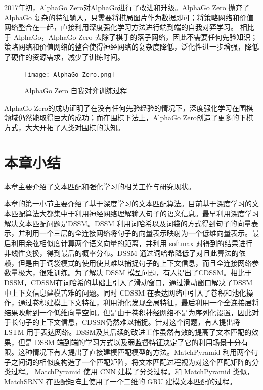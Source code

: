 2017年初，AlphaGo Zero\cite{Silver2017MasteringTG}对AlphaGo进行了改进和升级。AlphaGo Zero 抛弃了 AlphaGo 复杂的特征输入，只需要将棋局图片作为数据即可；将策略网络和价值网络整合在一起，直接利用深度强化学习方法进行端到端的自我对弈学习。
相比于 AlphaGo，AlphaGo Zero 去除了棋手的落子网络，因此不需要任何先验知识；策略网络和价值网络的整合使得神经网络的复杂度降低，泛化性进一步增强，降低了硬件的资源需求，减少了训练时间。
\begin{figure}[!htbp]\centering
\vspace{1em}
  \texttt{[image: AlphaGo\_Zero.png]}
  \caption{AlphaGo Zero 自我对弈训练过程}
  \label{fig:AlphaGo_Zero}       %
  \vspace{1em}
\end{figure}
AlphaGo Zero的成功证明了在没有任何先验经验的情况下，深度强化学习在围棋领域仍然能取得巨大的成功；而在围棋下法上，AlphaGo Zero创造了更多的下棋方式，大大开拓了人类对围棋的认知。

\section{本章小结}

本章主要介绍了文本匹配和强化学习的相关工作与研究现状。

本章的第一小节主要介绍了基于深度学习的文本匹配算法。目前基于深度学习的文本匹配算法大都集中于利用神经网络理解输入句子的语义信息。最早利用深度学习解决文本匹配问题是DSSM。DSSM 利用词哈希以及词袋的方式得到句子的向量表示，并利用一个三层的全连接网络将句子的向量表示映射为一个低维向量表示。最后利用余弦相似度计算两个语义向量的距离，并利用 softmax 对得到的结果进行非线性变换，得到最后的概率分布。DSSM 通过词哈希降低了对且此算法的依赖，但是由于词袋模式的使用使其难以捕捉句子的上下文信息，而且全连接网络参数量极大，很难训练。为了解决 DSSM 模型问题，有人提出了CDSSM。相比于DSSM，CDSSM在词哈希的基础上引入了滑动窗口，通过滑动窗口解决了DSSM中上下文信息建模苦难的问题。同时 CDSSM 在表达网络中引入了卷积和池化操作，通过卷积建模上下文特征，利用池化发现全局特征，最后利用一个全连接层将结果映射到一个低维向量空间。但是由于卷积神经网络不是为序列化设置，因此对于长句子的上下文信息，CDSSN仍然难以捕捉。针对这个问题，有人提出将 LSTM 用于表达网络。DSSM及其后续的改进工作虽然有效的提高了文本匹配的效果，但是 DSSM 端到端的学习方式以及弱监督特征决定了它的利用场景十分有限。这种情况下有人提出了直接建模匹配模型的方法。MatchPyramid 利用两个句子之间词的相似度构造了一个匹配矩阵，将文本匹配过程视为对这个匹配矩阵的分类过程。 MatchPyramid 使用 CNN 建模了分类过程。和 MatchPyramid 类似， MatchSRNN 在匹配矩阵上使用了一个二维的 GRU 建模文本匹配的过程。

